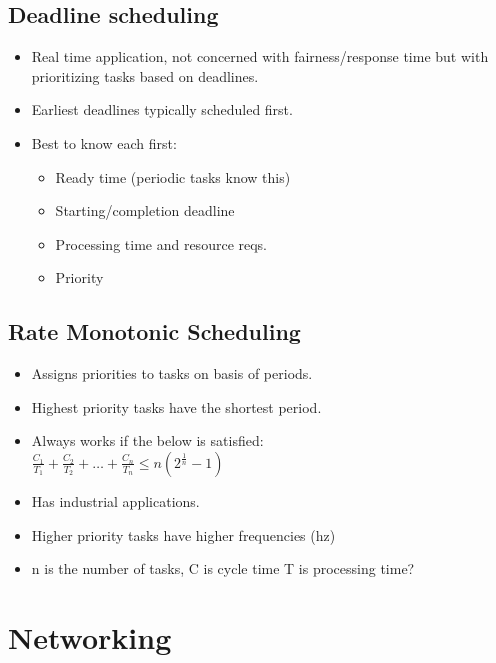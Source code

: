 \documentclass[fontsize=4.5pt]{scrartcl}
\begin{document}
\begin{multicols}{3}
      \subsection{Deadline scheduling}
        \begin{itemize}
          \item Real time application, not concerned with fairness/response time but with prioritizing tasks based on deadlines.
          \item Earliest deadlines typically scheduled first.
          \item Best to know each first:
          \begin{itemize}
            \item Ready time (periodic tasks know this)
            \item Starting/completion deadline
            \item Processing time and resource reqs.
            \item Priority
           \end{itemize}
        \end{itemize}
      \subsection{Rate Monotonic Scheduling}
        \begin{itemize}
          \item Assigns priorities to tasks on basis of periods.
          \item Highest priority tasks have the shortest period.
          \item Always works if the below is satisfied:\\
          $\frac{C_1}{T_1} + \frac{C_2}{T_2} + \dots + \frac{C_n}{T_n} \le n(2^{\frac{1}{n}}-1)$
          \item Has industrial applications.
          \item Higher priority tasks have higher frequencies (hz)
          \item n is the number of tasks, C is cycle time T is processing time?
        \end{itemize}
  \section{Networking}

\end{multicols}
\end{document}
